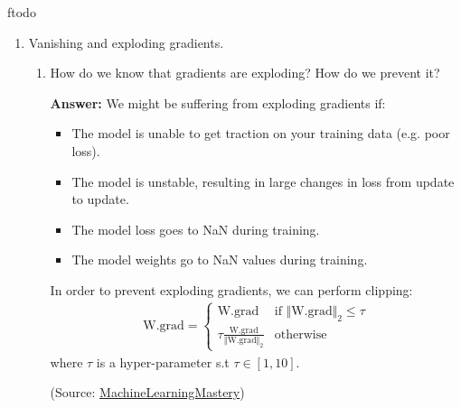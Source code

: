 ƒtodo\documentclass{article}
\newenvironment{QandA}{\begin{enumerate}[label=\arabic*.]}{\end{enumerate}}
\newenvironment{InnerQandA}{\begin{enumerate}[label=\roman*.]}{\end{enumerate}}
\newenvironment{answer}{\par\normalfont \textbf{Answer:}}{}
\begin{document}
\begin{QandA}
    \item Vanishing and exploding gradients.
    \begin{InnerQandA}
        \item How do we know that gradients are exploding? How do we prevent it?
        \begin{answer}
            We might be suffering from exploding gradients if:
            \begin{itemize}
                \item The model is unable to get traction on your training data (e.g. poor loss).
                \item The model is unstable, resulting in large changes in loss from update to update.
                \item The model loss goes to NaN during training.
                \item The model weights go to NaN values during training.
            \end{itemize}
            In order to prevent exploding gradients, we can perform clipping:
            \begin{align*}
                \text{W.grad} = \begin{cases}
                  \text{W.grad} & \text{if } \Vert \text{W.grad} \Vert_2 \le \tau \\
                  \tau \frac{\text{W.grad}}{\Vert \text{W.grad} \Vert_2} & \text{otherwise}
                \end{cases}
            \end{align*}
            where $\tau$ is a hyper-parameter s.t $\tau \in \left[1, 10\right]$.

            (Source: \href{https://machinelearningmastery.com/exploding-gradients-in-neural-networks/}{MachineLearningMastery})
        \end{answer}


\end{InnerQandA}
\end{QandA}
\end{document}
